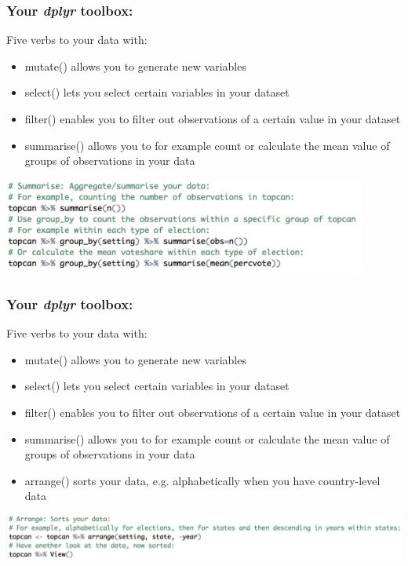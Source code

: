 \documentclass{beamer}
\begin{document}
\begin{frame}
\frametitle{Your \textit{dplyr} toolbox:}
Five verbs to {\color{blue}{manipulate}} your data with:
\begin{itemize}
\item mutate() allows you to generate new variables
\item select() lets you select certain variables in your dataset
\item filter() enables you to filter out observations of a certain value in your dataset
\item summarise() allows you to for example count or calculate the mean value of groups of observations in your data
\end{itemize}
\begin{center}
{\color{blue}{Example:}}
\includegraphics[width=0.9\textwidth]{summarise.jpg}
\end{center}
\end{frame}

\begin{frame}
\frametitle{Your \textit{dplyr} toolbox:}
Five verbs to {\color{blue}{manipulate}} your data with:
\begin{itemize}
\item mutate() allows you to generate new variables
\item select() lets you select certain variables in your dataset
\item filter() enables you to filter out observations of a certain value in your dataset
\item summarise() allows you to for example count or calculate the mean value of groups of observations in your data
\item arrange() sorts your data, e.g. alphabetically when you have country-level data
\end{itemize}
\begin{center}
{\color{blue}{Example:}}
\includegraphics[width=1\textwidth]{arrange.jpg}
\end{center}
\end{frame}
\end{document}
